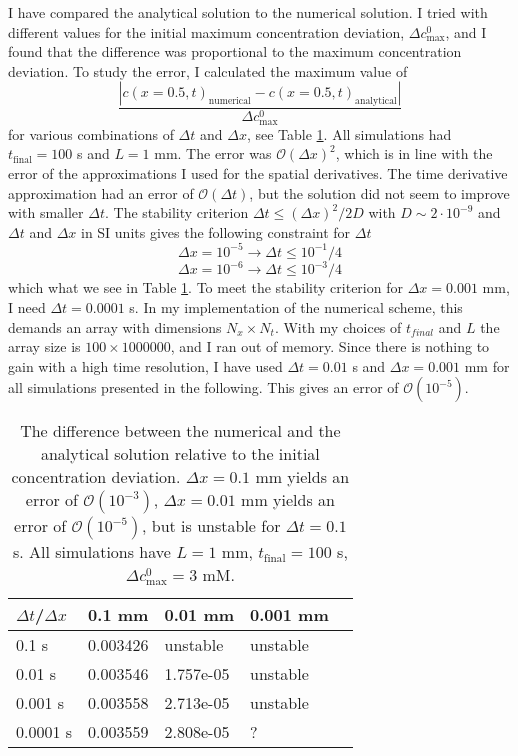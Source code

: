 \documentclass{article}
\begin{document}
I have compared the analytical solution to the numerical solution. I tried with different values for the initial maximum concentration deviation, $\Delta c^0_{\text{max}}$, and I found that the difference was proportional to the maximum concentration deviation. To study the error, I calculated the maximum value of
\begin{equation}
\frac{|c(x=0.5,t)_{\text{numerical}}-c(x=0.5,t)_{\text{analytical}}|}{\Delta c^0_{\text{max}}}
\end{equation}
for various combinations of $\Delta t$ and $\Delta x$, see Table \ref{tab:error}. All simulations had $t_{\text{final}} = 100$ s and $L=1$ mm. The error was $\mathcal{O}(\Delta x)^2$, which is in line with the error of the  approximations I used for the spatial derivatives. The time derivative approximation had an error of $\mathcal{O}(\Delta t)$, but the solution did not seem to improve with smaller $\Delta t$. The stability criterion $\Delta t \leq (\Delta x)^2/2D$ with $D \sim 2\cdot 10^{-9}$ and $\Delta t $ and $\Delta x$ in SI units gives the following constraint for $\Delta t$
$$\Delta x= 10^{-5} \rightarrow \Delta t \leq 10^{-1}/4$$
$$\Delta x= 10^{-6} \rightarrow \Delta t \leq 10^{-3}/4$$ 
which what we see in Table \ref{tab:error}. To meet the stability criterion for $\Delta x = 0.001$ mm, I need $\Delta t = 0.0001$ s. In my implementation of the numerical scheme, this demands an array with dimensions $N_x \times N_t$. With my choices of $t_{final}$ and $L$ the array size is  $100\times 1000 000$, and I ran out of memory.
Since there is nothing to gain with a high time resolution, I have used $\Delta t = 0.01$ s and $\Delta x = 0.001$ mm for all simulations presented in the following. This gives an error of $\mathcal{O}(10^{-5})$. 
\begin{table}[h!]
  \centering
  \caption{The difference between the numerical and the analytical solution relative to the initial concentration deviation. $\Delta x =0.1$ mm yields an error of $\mathcal{O}(10^{-3})$, $\Delta x =0.01$ mm yields an error of $\mathcal{O}(10^{-5})$, but is unstable for $\Delta t = 0.1$ s. All simulations have $L=1$ mm, $t_ {\text{final}} =100$ s, $\Delta c^0_{\text{max}} =3$ mM.}
  \label{tab:error}
  \begin{tabular}{l||l|l|l|l}
$\Delta t$/$\Delta x$ & 0.1 mm & 0.01 mm & 0.001 mm  \\
\hline
0.1 s & 0.003426 &  unstable & unstable \\
0.01 s & 0.003546 & 1.757e-05  & unstable \\
0.001 s & 0.003558 & 2.713e-05 & unstable \\
0.0001 s & 0.003559& 2.808e-05 & ? \\

 \end{tabular}
\end{table}
\end{document}
